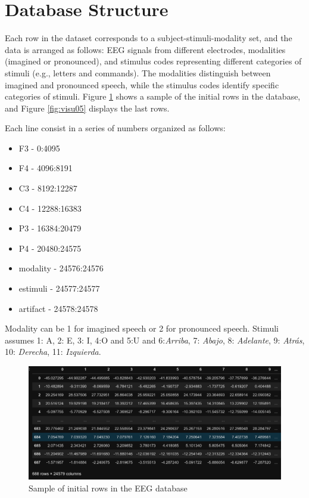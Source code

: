 \documentclass[format=sigconf]{acmart}
\begin{document}
	\section{Database Structure}
		\par Each row in the dataset corresponds to a subject-stimuli-modality set, and the data is arranged as follows: EEG signals from different electrodes, modalities (imagined or pronounced), and stimulus codes representing different categories of stimuli (e.g., letters and commands). The modalities distinguish between imagined and pronounced speech, while the stimulus codes identify specific categories of stimuli. Figure \ref{fig:visu04} shows a sample of the initial rows in the database, and Figure \ref{fig:visu05} displays the last rows.\newline
		
		\par Each line consist in a series of numbers organized as follows:
		\begin{itemize}
			\item F3 - 0:4095
			\item F4 - 4096:8191
			\item C3 - 8192:12287
			\item C4 - 12288:16383
			\item P3 - 16384:20479
			\item P4 - 20480:24575
			\item modality - 24576:24576
			\item estimuli - 24577:24577
			\item artifact - 24578:24578
		\end{itemize}
	
		\par Modality can be 1 for imagined speech or 2 for pronounced speech. Stimuli assumes 1: A, 2: E, 3: I, 4:O and 5:U and 6:\textit{Arriba}, 7: \textit{Abajo}, 8: \textit{Adelante}, 9: \textit{Atrás}, 10: \textit{Derecha}, 11: \textit{Izquierda}.
		
		\begin{figure}[h]
			\centering
			\includegraphics[width=\linewidth]{../presentation/images/visu04}
			\caption{Sample of initial rows in the EEG database}
			\label{fig:visu04}
		\end{figure}
		
\end{document}
